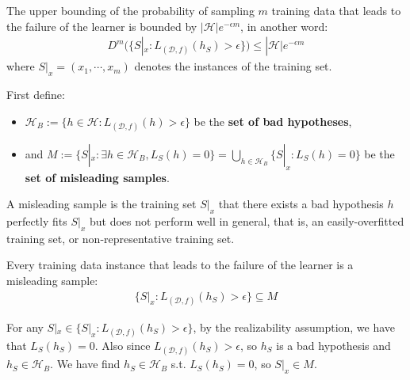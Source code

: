 \begin{lemma}
    The upper bounding of the probability of sampling $m$ training data that leads to the failure of the learner is bounded by $|\mathcal{H}|e^{-\epsilon m}$, in another word:
    \begin{align*}
        D^{m}(\{ S|_x : L_{(\mathcal{D},f)}(h_S) > \epsilon \}) \le |\mathcal{H}|e^{-\epsilon m}
    \end{align*}
    where $S|_x = (x_1,\cdots ,x_m)$ denotes the instances of the training set.
\end{lemma}

First define:
\begin{itemize}
    \item $\mathcal{H}_B := \{ h \in \mathcal{H} : L_{(\mathcal{D},f)}(h) > \epsilon \}$ be the \textbf{set of bad hypotheses},
    \item and $M := \{ S|_x : \exists h \in \mathcal{H}_B, L_S(h) = 0\} = \bigcup_{h \in \mathcal{H}_B}\{ S|_x : L_S(h) = 0 \} $ be the \textbf{set of misleading samples}.
\end{itemize}

\begin{intuition}
    A misleading sample is the training set $S|_x$ that there exists a bad hypothesis $h$ perfectly fits $S|_x$ but does not perform well in general, that is, an easily-overfitted training set, or non-representative training set.
\end{intuition}

\begin{remark}
    Every training data instance that leads to the failure of the learner is a misleading sample:
    \begin{align*}
        \{ S|_x : L_{(\mathcal{D},f)}(h_S) > \epsilon \} \subseteq M
    \end{align*}
\end{remark}
\begin{explanation}
    For any $S|_x \in \{ S|_x : L_{(\mathcal{D},f)}(h_S) > \epsilon \}$, by the realizability assumption, we have that $L_S(h_S) = 0$. Also since $L_{(\mathcal{D},f)}(h_S) > \epsilon$, so $h_S$ is a bad hypothesis and $h_S \in \mathcal{H}_B$. We have find $h_S \in \mathcal{H}_B$ s.t. $L_S(h_S) = 0$, so $S|_x \in M$.
\end{explanation}

